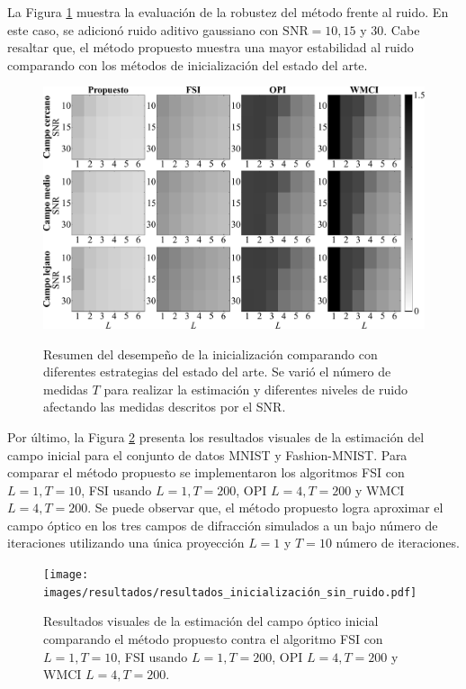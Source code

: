 La Figura \ref{fig:noisy_scenario} muestra la evaluación de la robustez del método frente al ruido. En este caso, se adicionó ruido aditivo gaussiano con $\mathrm{SNR} = 10, 15$ y $30$. Cabe resaltar que, el método propuesto muestra una mayor estabilidad al ruido comparando con los métodos de inicialización del estado del arte.

\begin{figure}[!h]
    \caption{Resumen del desempeño de la inicialización comparando con diferentes estrategias del estado del arte. Se varió el número de medidas $T$ para realizar la estimación y diferentes niveles de ruido afectando las medidas descritos por el SNR.}
    \includegraphics[width=1\linewidth]{images/resultados/Noisy_Initializations.pdf}
    \label{fig:noisy_scenario}
\end{figure}

Por último, la Figura \ref{fig:resultados_inicialización_sin_ruido} presenta los resultados visuales de la estimación del campo inicial para el conjunto de datos MNIST y Fashion-MNIST. Para comparar el método propuesto se implementaron los algoritmos FSI con $L = 1, T = 10$, FSI usando $L = 1, T=200$, OPI $L = 4, T=200$ y WMCI $L = 4, T=200$. Se puede observar que, el método propuesto logra aproximar el campo óptico en los tres campos de difracción simulados a un bajo número de iteraciones utilizando una única proyección $L=1$ y $T=10$ número de iteraciones.

\begin{figure}[!h]
    \centering
    \caption{Resultados visuales de la estimación del campo óptico inicial comparando el método propuesto contra el algoritmo FSI con $L = 1, T = 10$, FSI usando $L = 1, T=200$, OPI $L = 4, T=200$ y WMCI $L = 4, T=200$.}
    \texttt{[image: images/resultados/resultados\_inicialización\_sin\_ruido.pdf]}
    \label{fig:resultados_inicialización_sin_ruido}
\end{figure}

